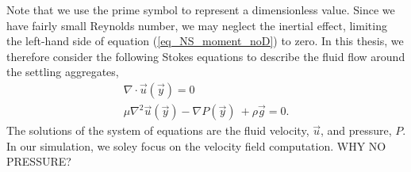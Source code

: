Note that we use the prime symbol to represent a dimensionless value.
Since we have fairly small Reynolds number, we may neglect the inertial effect, limiting the left-hand side of equation (\ref{eq_NS_moment_noD}) to zero.
In this thesis, we therefore consider the following Stokes equations to describe the fluid flow around the settling aggregates,
 \begin{align}
	\nabla \cdot \vec{u} (\vec{y}) = 0  
	\nonumber \\
	\mu \nabla^2 \vec{u} (\vec{y})   - \nabla P(\vec{y}) \ + \rho  \vec{g} = 0.
	\label{eq_stokes2}
\end{align}
The solutions of the system of equations are the fluid velocity, $\vec{u}$, and pressure, $P$. In our simulation, we soley focus on the velocity field computation. {\color{blue}WHY NO PRESSURE?}
%
%
%
